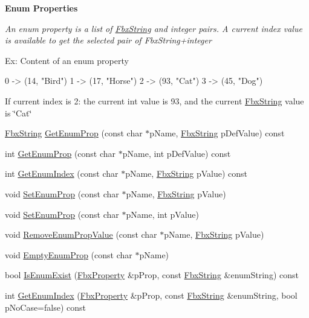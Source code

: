 \begin{Indent}\textbf{ Enum Properties}\par
{\em An enum property is a list of \hyperlink{class_fbx_string}{Fbx\+String} and integer pairs. A current index value is available to get the selected pair of Fbx\+String+integer

Ex\+: Content of an enum property 
\begin{DoxyCode}
0 -> (14, \textcolor{stringliteral}{"Bird"})
1 -> (17, \textcolor{stringliteral}{"Horse"})
2 -> (93, \textcolor{stringliteral}{"Cat"})
3 -> (45, \textcolor{stringliteral}{"Dog"})
\end{DoxyCode}


If current index is 2\+: the current int value is 93, and the current \hyperlink{class_fbx_string}{Fbx\+String} value is \char`\"{}\+Cat\char`\"{} }\begin{DoxyCompactItemize}
\item 
\hyperlink{class_fbx_string}{Fbx\+String} \hyperlink{class_fbx_i_o_settings_a4c34547b1b4267694f51ab159d95b9da}{Get\+Enum\+Prop} (const char $\ast$p\+Name, \hyperlink{class_fbx_string}{Fbx\+String} p\+Def\+Value) const
\item 
int \hyperlink{class_fbx_i_o_settings_a042c5ff793f455ef7e982fb2a9f01ce7}{Get\+Enum\+Prop} (const char $\ast$p\+Name, int p\+Def\+Value) const
\item 
int \hyperlink{class_fbx_i_o_settings_a0d328ff98e1cce8d911e78cfe83aa662}{Get\+Enum\+Index} (const char $\ast$p\+Name, \hyperlink{class_fbx_string}{Fbx\+String} p\+Value) const
\item 
void \hyperlink{class_fbx_i_o_settings_a26d37be8fcf5c4d74ee0dfb95b39923d}{Set\+Enum\+Prop} (const char $\ast$p\+Name, \hyperlink{class_fbx_string}{Fbx\+String} p\+Value)
\item 
void \hyperlink{class_fbx_i_o_settings_af1000ac57d0e7af9e55f9f629d50330f}{Set\+Enum\+Prop} (const char $\ast$p\+Name, int p\+Value)
\item 
void \hyperlink{class_fbx_i_o_settings_aebf0649980477e8ec80d1d9364304392}{Remove\+Enum\+Prop\+Value} (const char $\ast$p\+Name, \hyperlink{class_fbx_string}{Fbx\+String} p\+Value)
\item 
void \hyperlink{class_fbx_i_o_settings_a6f30f2ea6148cfe5070444c38842ed6f}{Empty\+Enum\+Prop} (const char $\ast$p\+Name)
\item 
bool \hyperlink{class_fbx_i_o_settings_a8276b09f853df8e836a9760fd8f8cbfb}{Is\+Enum\+Exist} (\hyperlink{class_fbx_property}{Fbx\+Property} \&p\+Prop, const \hyperlink{class_fbx_string}{Fbx\+String} \&enum\+String) const
\item 
int \hyperlink{class_fbx_i_o_settings_aef7ef50f0117516d9326b4b74e70f314}{Get\+Enum\+Index} (\hyperlink{class_fbx_property}{Fbx\+Property} \&p\+Prop, const \hyperlink{class_fbx_string}{Fbx\+String} \&enum\+String, bool p\+No\+Case=false) const
\end{DoxyCompactItemize}
\end{Indent}
